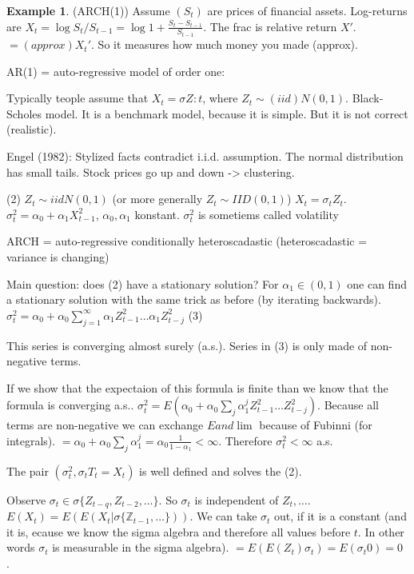 \documentclass[12pt,a4paper]{amsart}
\theoremstyle{definition} %
\newtheorem{example}[defn]{Example}
\theoremstyle{plain} %
\newcommand{\Z}{\mathbb Z}
\begin{document}
\begin{example}(ARCH(1))
Assume $(S_t)$ are prices of financial assets. Log-returns are $X_t = \log{S_t / S_{t-1}} = \log{1 + \frac{S_t - S_{t-1}}{S_{t-1}}}$. The frac is relative return $X'$. 
$= (approx) X_t'$. So it measures how much money you made (approx).

AR(1) = auto-regressive model of order one:

Typically teople assume that $X_t = \sigma Z:t$, where $Z_t \sim (iid) N(0,1)$. Black-Scholes model. It is a benchmark model, because it is simple. But it is not correct (realistic).



Engel (1982):
Stylized facts contradict i.i.d. assumption. The normal distribution has small tails. Stock prices go up and down -> clustering.

(2)
$Z_t \sim iid N(0,1)$ (or more generally $Z_t \sim IID(0,1)$)
$X_t = \sigma_t Z_t$.
$\sigma_t^2 = \alpha_0 + \alpha_1 X_{t-1}^2$, $\alpha_0, \alpha_1$ konstant.
$\sigma_t^2$ is sometiems called volatility

ARCH = auto-regressive conditionally heteroscadastic (heteroscadastic = variance is changing)

Main question: does 
(2) have a stationary solution? 
For $\alpha_1 \in (0,1)$ one can find a stationary solution with the same trick as before (by iterating backwards).
$\sigma_t^2 = \alpha_0 + \alpha_0 \sum_{j = 1}^\infty \alpha_1 Z_{t-1}^2 \dots \alpha_1Z_{t-j}^2$ 
(3)

This series is converging almost surely (a.s.). 
Series in 
(3) is only made of non-negative terms. 

If we show that the expectaion of this formula is finite than we know that the formula is converging a.s..
$\sigma_t^2 = E(\alpha_0 + \alpha_0 \sum_j \alpha_1^j Z_{t-1}^2 \dots Z_{t-j}^2)$.
Because all terms are non-negative we can exchange $E and \lim$ because of Fubinni (for integrals).
$ = \alpha_0 + \alpha_0 \sum_j \alpha_1^j = \alpha_0 \frac{1}{1-\alpha_1} < \infty$. Therefore $\sigma_t^2 < \infty$ a.s.

The pair $(\sigma_t^2, \sigma_tT_t = X_t)$ is well defined and solves the 
(2).

Observe $\sigma_t \in \sigma\{ Z_{t-q},Z_{t-2}, \dots\}$. So $\sigma_t$ is independent of $Z_t, \dots$.
$E(X_t) = E(E(X_t | \sigma\{\Z_{t-1}, \dots\}))$. We can take $\sigma_t$ out, if it is a constant (and it is, ecause we know the sigma algebra and therefore all values before $t$. In other words $\sigma_t$ is measurable in the sigma algebra). 
$ =E(E(Z_t)\sigma_t)= E(\sigma_t 0) = 0$ .


\end{example}
\end{document}
